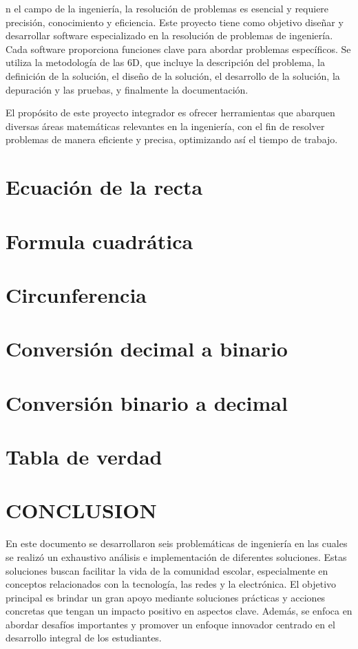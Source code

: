 \documentclass{IEEEcsmag}
\begin{document}
\maketitle


n el campo de la ingeniería, la resolución de problemas es esencial y requiere precisión, conocimiento y eficiencia. Este proyecto tiene como objetivo diseñar y desarrollar software especializado en la resolución de problemas de ingeniería. Cada software proporciona funciones clave para abordar problemas específicos. Se utiliza la metodología de las 6D, que incluye la descripción del problema, la definición de la solución, el diseño de la solución, el desarrollo de la solución, la depuración y las pruebas, y finalmente la documentación.

El propósito de este proyecto integrador es ofrecer herramientas que abarquen diversas áreas matemáticas relevantes en la ingeniería, con el fin de resolver problemas de manera eficiente y precisa, optimizando así el tiempo de trabajo.

\section{Ecuación de la recta}

\section{Formula cuadrática}

\section{Circunferencia}

\section{Conversión decimal a binario}

\section{Conversión binario a decimal}

\section{Tabla de verdad}


\section{CONCLUSION}
En este documento se desarrollaron seis problemáticas de ingeniería en las cuales se realizó un exhaustivo análisis e implementación de diferentes soluciones. Estas soluciones buscan facilitar la vida de la comunidad escolar, especialmente en conceptos relacionados con la tecnología, las redes y la electrónica. El objetivo principal es brindar un gran apoyo mediante soluciones prácticas y acciones concretas que tengan un impacto positivo en aspectos clave. Además, se enfoca en abordar desafíos importantes y promover un enfoque innovador centrado en el desarrollo integral de los estudiantes.
\end{document}
